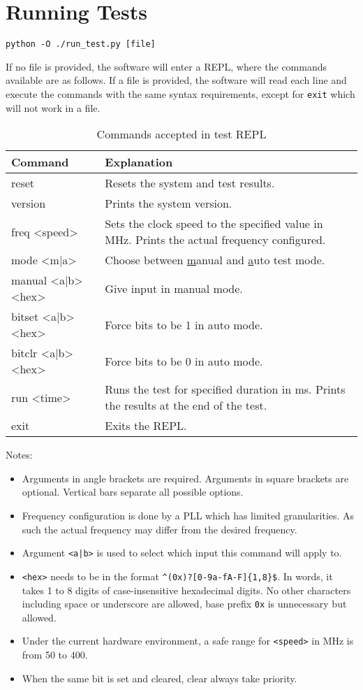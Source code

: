\section{Running Tests}

\texttt{python -O ./run\_test.py [file]}

If no file is provided, the software will enter a REPL, where the commands available are as follows.
If a file is provided, the software will read each line and execute the commands with the same syntax requirements, except for \texttt{exit} which will not work in a file.

\begin{table}[H]
  \centering
  \begin{tabular}{|>{\ttfamily}p{11em}|p{\dimexpr\textwidth-18em}|}
    \hline
    \textrm{Command}   & Explanation \\
    \hline
    reset              & Resets the system and test results. \\
    version            & Prints the system version. \\
    freq <speed>       & Sets the clock speed to the specified value in MHz. Prints the actual frequency configured. \\
    mode <m|a>         & Choose between \underline{m}anual and \underline{a}uto test mode. \\
    manual <a|b> <hex>  & Give input in manual mode. \\
    bitset <a|b> <hex>  & Force bits to be 1 in auto mode. \\
    bitclr <a|b> <hex>  & Force bits to be 0 in auto mode. \\
    run <time>         & Runs the test for specified duration in ms. Prints the results at the end of the test. \\
    exit               & Exits the REPL. \\
    \hline
  \end{tabular}
  \caption{Commands accepted in test REPL}
\end{table}

Notes:
\begin{itemize}
  \item Arguments in angle brackets are required.
        Arguments in square brackets are optional.
        Vertical bars separate all possible options.
  \item Frequency configuration is done by a PLL which has limited granularities.
        As such the actual frequency may differ from the desired frequency.
  \item Argument \texttt{<a|b>} is used to select which input this command will apply to.
  \item \texttt{<hex>} needs to be in the format \texttt{\textasciicircum(0x)?[0-9a-fA-F]\{1,8\}\$}.
        In words, it takes 1 to 8 digits of case-insensitive hexadecimal digits.
        No other characters including space or underscore are allowed, base prefix \texttt{0x} is unnecessary but allowed.
  \item Under the current hardware environment, a safe range for \texttt{<speed>} in MHz is from 50 to 400.
  \item When the same bit is set and cleared, clear always take priority.
\end{itemize}
